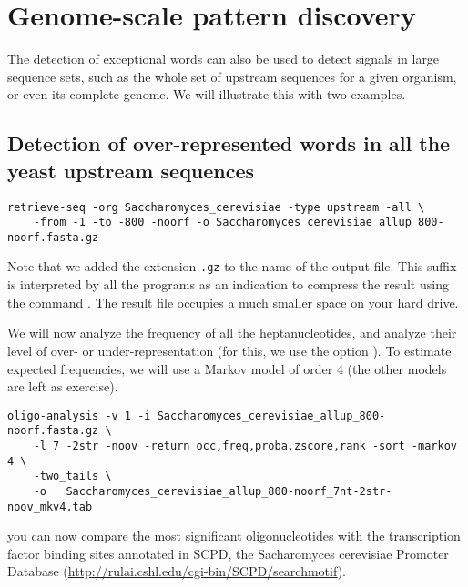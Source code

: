 \section{Genome-scale pattern discovery}

The detection of exceptional words can also be used to detect signals
in large sequence sets, such as the whole set of upstream sequences
for a given organism, or even its complete genome. We will illustrate
this with two examples.

\subsection{Detection of over-represented words in all the yeast
  upstream   sequences}

{\color{Blue} \begin{footnotesize} 
\begin{verbatim}
retrieve-seq -org Saccharomyces_cerevisiae -type upstream -all \
    -from -1 -to -800 -noorf -o Saccharomyces_cerevisiae_allup_800-noorf.fasta.gz
\end{verbatim} \end{footnotesize}
}

Note that we added the extension \texttt{.gz} to the name of the
output file. This suffix is interpreted by all the \RSAT programs as
an indication to compress the result using the command
. The result file occupies a much smaller space on your
hard drive.

We will now analyze the frequency of all the heptanucleotides, and
analyze their level of over- or under-representation (for this, we use
the option \option{-two\_tails}). To estimate expected frequencies, we
will use a Markov model of order 4 (the other models are left as
exercise).

{\color{Blue} \begin{footnotesize} 
\begin{verbatim}
oligo-analysis -v 1 -i Saccharomyces_cerevisiae_allup_800-noorf.fasta.gz \
    -l 7 -2str -noov -return occ,freq,proba,zscore,rank -sort -markov 4 \
    -two_tails \
    -o   Saccharomyces_cerevisiae_allup_800-noorf_7nt-2str-noov_mkv4.tab
\end{verbatim} \end{footnotesize}
}

you can now compare the most significant oligonucleotides with the
transcription factor binding sites annotated in SCPD, the Sacharomyces
cerevisiae Promoter Database
(\url{http://rulai.cshl.edu/cgi-bin/SCPD/searchmotif}).

